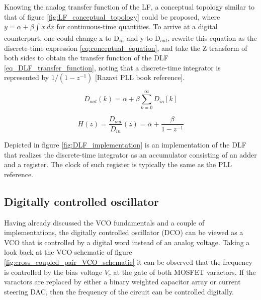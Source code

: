 Knowing the analog transfer function of the LF, a conceptual topology similar to that of figure \ref{fig:LF_conceptual_topology} could be proposed, where $y = \alpha + \beta \int_{}^{} x \,dx$
for continuous-time quantities. To arrive at a digital counterpart, one could change x to D$_{in}$ and y to D$_{out}$, rewrite this equation as the discrete-time expression
\eqref{eq:conceptual_equation}, and take the Z transform of both sides to obtain the transfer function of the DLF \eqref{eq_DLF_transfer_function}, noting that a discrete-time integrator
is represented by $1/(1 - z^{-1})$ [Razavi PLL book reference].

\begin{equation}
    D_{out}(k) = \alpha + \beta \sum_{k=0}^{\infty} D_{in}[k]
    \label{eq:conceptual_equation}
\end{equation}

\begin{equation}
    H(z) = \frac{D_{out}}{D_{in}}(z) = \alpha + \frac{\beta}{1 - z^{-1}}
    \label{eq_DLF_transfer_function}
\end{equation}

Depicted in figure \ref{fig:DLF_implementation} is an implementation of the DLF that realizes the discrete-time integrator as an accumulator consisting of an adder and a register. The
clock of such register is typically the same as the PLL reference.

\subsection{Digitally controlled oscillator}

Having already discussed the VCO fundamentals and a couple of implementations, the digitally controlled oscillator (DCO) can be viewed as a VCO that is controlled by a digital word instead
of an analog voltage. Taking a look back at the VCO schematic of figure \ref{fig:cross_coupled_pair_VCO_schematic} it can be observed that the frequency is controlled by the bias
voltage $V_c$ at the gate of both MOSFET varactors. If the varactors are replaced by either a binary weighted capacitor array or current steering DAC, then the frequency of the circuit can
be controlled digitally.

